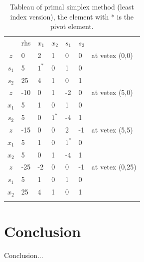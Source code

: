 \documentclass[11pt]{article}
\begin{document}
\begin{table}[H]
\caption{Tableau of primal simplex method (least index version), the element with * is the pivot element. }
\label{Table: tableau}
\centering
\begin{tabular}{c|llllll}
   & rhs & $x_1$ & $x_2$ & $s_1$ & $s_2$ &                 \\ \cline{1-6}
$z$  & 0   & 2  & 1  & 0  & 0  & at vetex (0,0)  \\
$s_1$ & 5   & $1^*$  & 0  & 1  & 0  &                 \\
$s_2$ & 25  & 4  & 1  & 0  & 1  &                 \\ \hhline{======}
$z$  & -10 & 0  & 1  & -2 & 0  & at vetex (5,0)  \\
$x_1$ & 5   & 1  & 0  & 1  & 0  &                 \\
$s_2$ & 5   & 0  & $1^*$  & -4 & 1  &                 \\ \hhline{======}
$z$  & -15 & 0  & 0  & 2  & -1 & at vetex (5,5)  \\
$x_1$ & 5   & 1  & 0  & $1^*$  & 0  &                 \\
$x_2$ & 5   & 0  & 1  & -4 & 1  &                 \\ \hhline{======}
$z$  & -25 & -2 & 0  & 0  & -1 & at vetex (0,25) \\
$s_1$ & 5   & 1  & 0  & 1  & 0  &                 \\
$x_2$ & 25  & 4  & 1  & 0  & 1  &                 \\ \hhline{======}
\end{tabular}
\end{table}




\section{Conclusion}
Conclusion...
\end{document}
